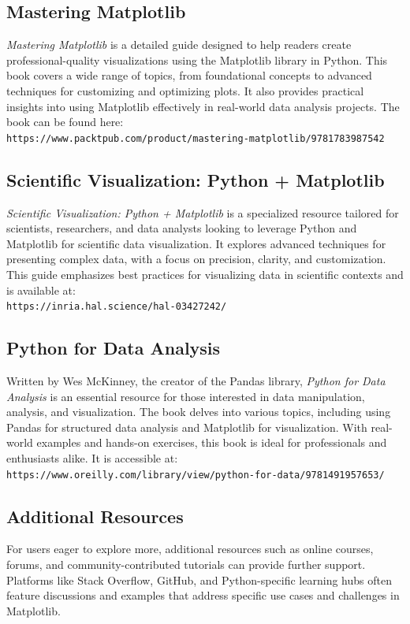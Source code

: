 \subsection{Mastering Matplotlib}
\textit{Mastering Matplotlib} is a detailed guide designed to help readers create professional-quality visualizations using the Matplotlib library in Python. This book covers a wide range of topics, from foundational concepts to advanced techniques for customizing and optimizing plots. It also provides practical insights into using Matplotlib effectively in real-world data analysis projects. The book can be found here: \\
\texttt{https://www.packtpub.com/product/mastering-matplotlib/9781783987542}

\subsection{Scientific Visualization: Python + Matplotlib}
\textit{Scientific Visualization: Python + Matplotlib} is a specialized resource tailored for scientists, researchers, and data analysts looking to leverage Python and Matplotlib for scientific data visualization. It explores advanced techniques for presenting complex data, with a focus on precision, clarity, and customization. This guide emphasizes best practices for visualizing data in scientific contexts and is available at: \\
\texttt{https://inria.hal.science/hal-03427242/}

\subsection{Python for Data Analysis}
Written by Wes McKinney, the creator of the Pandas library, \textit{Python for Data Analysis} is an essential resource for those interested in data manipulation, analysis, and visualization. The book delves into various topics, including using Pandas for structured data analysis and Matplotlib for visualization. With real-world examples and hands-on exercises, this book is ideal for professionals and enthusiasts alike. It is accessible at: \\
\texttt{https://www.oreilly.com/library/view/python-for-data/9781491957653/}

\subsection{Additional Resources}
For users eager to explore more, additional resources such as online courses, forums, and community-contributed tutorials can provide further support. Platforms like Stack Overflow, GitHub, and Python-specific learning hubs often feature discussions and examples that address specific use cases and challenges in Matplotlib.

